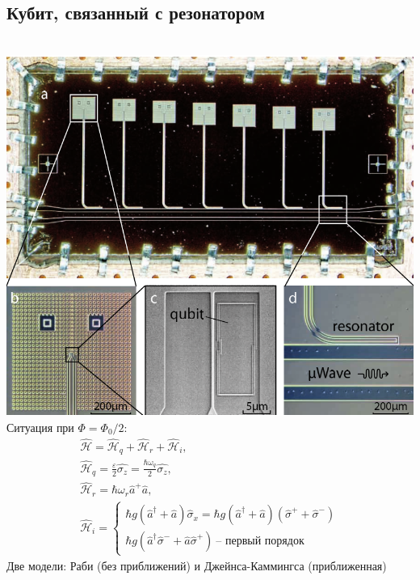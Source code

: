 \documentclass[aspectratio=169, 13pt]{beamer}
\begin{document}
\subsection{Кубит, связанный с резонатором}
\begin{frame}[c]\frametitle{\secname}\framesubtitle{\subsecname}
\begin{columns}[c]

\centering
\includegraphics[width=\textwidth]{marcus_chip}
Ситуация при $\Phi = \Phi_0/2$:
\begin{gather*}
\hat{\mathcal{H}} = \hat{\mathcal{H}}_{q}+\hat{\mathcal{H}}_{r}+\hat{\mathcal{H}}_{i},\\
\hat{\mathcal{H}}_{q} = \frac{\varepsilon}{2} \hat{\sigma_z} = \frac{\hbar\omega_q}{2}\hat{\sigma_z},\\
\hat{\mathcal{H}}_{r} = \hbar\omega_r \hat a^+ \hat{a}, \\
\hat{\mathcal{H}}_{i} = 
\begin{cases} 
\hbar g(\hat a^\dag + \hat{a})\hat{\sigma}_x = \hbar g(\hat a^\dag + \hat{a})(\hat\sigma^++\hat\sigma^-) \\ 
\hbar g(\hat a^\dag \hat\sigma^- + \hat{a}\hat\sigma^+)\ \text{-- первый порядок}
\end{cases}
\end{gather*}
Две модели: Раби (без приближений) и Джейнса-Каммингса (приближенная)

\end{columns}
\end{frame}
\end{document}
